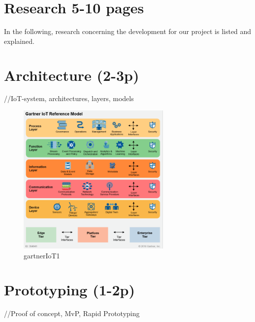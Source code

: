 


\section{Research 5-10 pages} 
In the following, research concerning the development for our project is listed and explained.
\section{Architecture (2-3p)}
//IoT-system, architectures, layers, models 
\begin{figure}[th]
	\centering
	\includegraphics[width=75mm,scale=0.75]{Figures/gartnerIoT}
	\decoRule
	\caption[Gartner]{gartnerIoT1}
	\label{fig:gartnerIoT}
\end{figure}
\section{Prototyping (1-2p)}
//Proof of concept, MvP, Rapid Prototyping
